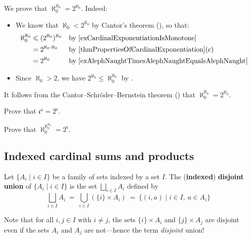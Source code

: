 \begin{example}
We prove that $\aleph_0^{\aleph_0} = 2^{\aleph_0}$. Indeed:
\begin{itemize}
\item We know that $\aleph_0 < 2^{\aleph_0}$ by Cantor's theorem (), so that:
\begin{align*}
\aleph_0^{\aleph_0} &\le (2^{\aleph_0})^{\aleph_0} && \text{by \Cref{exCardinalExponentiationIsMonotone}} \\
&= 2^{\aleph_0 \cdot \aleph_0} && \text{by \Cref{thmPropertiesOfCardinalExponentiation}(c)} \\
&= 2^{\aleph_0} && \text{by \Cref{exAlephNaughtTimesAlephNaughtEqualsAlephNaught}}
\end{align*}
\item Since $\aleph_0 > 2$, we have $2^{\aleph_0} \le \aleph_0^{\aleph_0}$ by .
\end{itemize}
It follows from the Cantor--Schr\"{o}der--Bernstein theorem () that $\aleph_0^{\aleph_0} = 2^{\aleph_0}$.
\end{example}

\begin{exercise}
Prove that $\mathfrak{c}^{\mathfrak{c}} = 2^{\mathfrak{c}}$.
\end{exercise}

\begin{exercise}
Prove that $\aleph_0^{\aleph_0^{\aleph_0}} = 2^{\mathfrak{c}}$.
\end{exercise}

\subsection*{Indexed cardinal sums and products}

\begin{definition}
\label{defIndexedDisjointUnion}
Let $\{ A_i \mid i \in I \}$ be a family of sets indexed by a set $I$. The (\textbf{indexed}) \textbf{disjoint union} of $\{ A_i \mid i \in I \}$ is the set $\displaystyle \bigsqcup_{i \in I} A_i$  defined by
\[ \bigsqcup_{i \in I} A_i ~=~ \bigcup_{i \in I} (\{ i \} \times A_i) ~=~ \{ (i, a) \mid i \in I,~ a \in A_i \} \]
\end{definition}

Note that for all $i,j \in I$ with $i \ne j$, the sets $\{ i \} \times A_i$ and $\{ j \} \times A_j$ are disjoint even if the sets $A_i$ and $A_j$ are not---hence the term \textit{disjoint} union!

